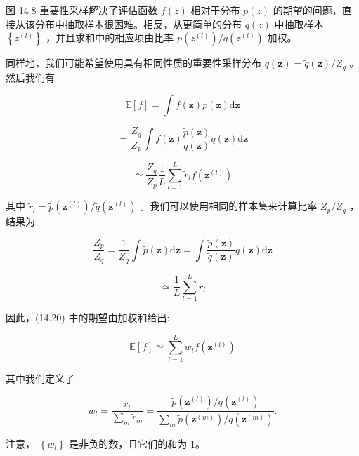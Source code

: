 \documentclass[10pt]{article}
\begin{document}
图 14.8 重要性采样解决了评估函数 \(f\left( z\right)\) 相对于分布 \(p\left( z\right)\) 的期望的问题，直接从该分布中抽取样本很困难。相反，从更简单的分布 \(q\left( z\right)\) 中抽取样本 \(\left\{  {z}^{\left( l\right) }\right\}\) ，并且求和中的相应项由比率 \(p\left( {z}^{\left( l\right) }\right) /q\left( {z}^{\left( l\right) }\right)\) 加权。

同样地，我们可能希望使用具有相同性质的重要性采样分布 \(q\left( \mathbf{z}\right)  = \widetilde{q}\left( \mathbf{z}\right) /{Z}_{q}\) 。然后我们有

\[
\mathbb{E}\left\lbrack  f\right\rbrack   = \int f\left( \mathbf{z}\right) p\left( \mathbf{z}\right) \mathrm{d}\mathbf{z}
\]

\[
= \frac{{Z}_{q}}{{Z}_{p}}\int f\left( \mathbf{z}\right) \frac{\widetilde{p}\left( \mathbf{z}\right) }{\widetilde{q}\left( \mathbf{z}\right) }q\left( \mathbf{z}\right) \mathrm{d}\mathbf{z}
\]

\[
\simeq  \frac{{Z}_{q}}{{Z}_{p}}\frac{1}{L}\mathop{\sum }\limits_{{l = 1}}^{L}{\widetilde{r}}_{l}f\left( {\mathbf{z}}^{\left( l\right) }\right)  \tag{14.20}
\]

其中 \({\widetilde{r}}_{l} = \widetilde{p}\left( {\mathbf{z}}^{\left( l\right) }\right) /\widetilde{q}\left( {\mathbf{z}}^{\left( l\right) }\right)\) 。我们可以使用相同的样本集来计算比率 \({Z}_{p}/{Z}_{q}\) ，结果为

\[
\frac{{Z}_{p}}{{Z}_{q}} = \frac{1}{{Z}_{q}}\int \widetilde{p}\left( \mathbf{z}\right) \mathrm{d}\mathbf{z} = \int \frac{\widetilde{p}\left( \mathbf{z}\right) }{\widetilde{q}\left( \mathbf{z}\right) }q\left( \mathbf{z}\right) \mathrm{d}\mathbf{z}
\]

\[
\simeq  \frac{1}{L}\mathop{\sum }\limits_{{l = 1}}^{L}{\widetilde{r}}_{l} \tag{14.21}
\]

因此，(14.20) 中的期望由加权和给出:

\[
\mathbb{E}\left\lbrack  f\right\rbrack   \simeq  \mathop{\sum }\limits_{{l = 1}}^{L}{w}_{l}f\left( {\mathbf{z}}^{\left( l\right) }\right)  \tag{14.22}
\]

其中我们定义了

\[
{w}_{l} = \frac{{\widetilde{r}}_{l}}{\mathop{\sum }\limits_{m}{\widetilde{r}}_{m}} = \frac{\widetilde{p}\left( {\mathbf{z}}^{\left( l\right) }\right) /q\left( {\mathbf{z}}^{\left( l\right) }\right) }{\mathop{\sum }\limits_{m}\widetilde{p}\left( {\mathbf{z}}^{\left( m\right) }\right) /q\left( {\mathbf{z}}^{\left( m\right) }\right) }. \tag{14.23}
\]

注意， \(\left\{  {w}_{l}\right\}\) 是非负的数，且它们的和为 1。
\end{document}
